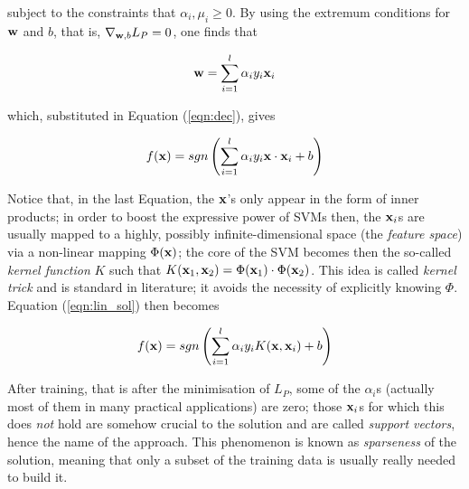 subject to the constraints that $\alpha_i,\mu_i\geq 0$. By using the
extremum conditions for $\mathbf{w}$ and $b$, that is, $\nabla_{\mathbf{w},b} L_P =
0$, one finds that

\begin{equation} \label{eqn:w1}
  \mathbf{w} = \sum_{i=1}^l \alpha_i y_i \mathbf{x}_i
\end{equation}

which, substituted in Equation (\ref{eqn:dec}), gives

\begin{equation} \label{eqn:lin_sol}
  f(\mathbf{x}) = sgn \left( \sum_{i=1}^l \alpha_i y_i \mathbf{x} \cdot \mathbf{x}_i + b \right)
\end{equation}

Notice that, in the last Equation, the $\mathbf{x}$'s only appear in the form
of inner products; in order to boost the expressive power of SVMs
then, the $\mathbf{x}_i$s are usually mapped to a highly, possibly
infinite-dimensional space (the \emph{feature space}) via a
non-linear mapping $\Phi(\mathbf{x})$; the core of the SVM becomes then the
so-called \emph{kernel function} $K$ such that $K(\mathbf{x}_1,\mathbf{x}_2) =
\Phi(\mathbf{x}_1)\cdot\Phi(\mathbf{x}_2)$. This idea is called \emph{kernel trick}
and is standard in literature; it avoids the necessity of explicitly
knowing $\Phi$. Equation (\ref{eqn:lin_sol}) then becomes

\begin{equation} \label{eqn:sol}
  f(\mathbf{x}) = sgn \left( \sum_{i=1}^l \alpha_i y_i K(\mathbf{x},\mathbf{x}_i) + b \right)
\end{equation}

After training, that is after the minimisation of $L_P$, some of the
$\alpha_i$s (actually most of them in many practical applications) are
zero; those $\mathbf{x}_i$s for which this does \emph{not} hold are somehow
crucial to the solution and are called \emph{support vectors}, hence
the name of the approach. This phenomenon is known as
\emph{sparseness} of the solution, meaning that only a subset of the
training data is usually really needed to build it.
